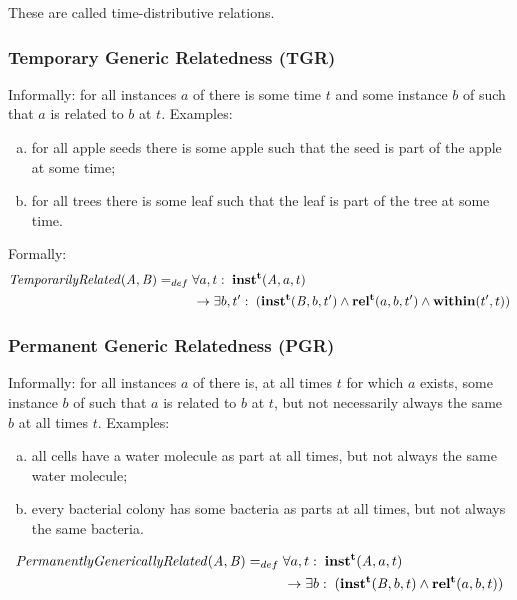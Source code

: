 These are called time-distributive relations.

\subsubsection*{Temporary Generic Relatedness (TGR)}

Informally: for all instances $a$ of  there is some time $t$ and some instance $b$ of
 such that $a$ is related to $b$ at $t$. Examples:
\begin{enumerate}[(a)]
\item for all apple seeds there is
some apple such that the seed is part of the apple at some time;
\item for all
trees there is some leaf such that the leaf is part of the tree at some time.
\end{enumerate}

Formally:
\begin{equation}
\begin{split}
\mathit{TemporarilyRelated}(\mathit{A},\mathit{B}) =_{def}&\;
\forall a, t:\; \mathrm{\mathbf{inst^t}}(\mathit{A}, a, t) \\
&\ \rightarrow
\exists b, t^\prime:\;(\mathrm{\mathbf{inst^t}}(\mathit{B},b,t^\prime) \wedge
\mathrm{\mathbf{rel^t}}(a,b,t^\prime) \wedge \mathrm{\mathbf{within}}(t^\prime,t))
\end{split}
\label{eq:temporarily:cls}
\end{equation}

\subsubsection*{Permanent Generic Relatedness (PGR)}

Informally: for all instances $a$ of  there is, at all times $t$ for which
$a$ exists,
some instance $b$ of  such that $a$ is related to $b$ at $t$, but not necessarily
always the same $b$ at all times $t$. Examples:
\begin{enumerate}[(a)]
\item all cells have a water molecule as
part at all times, but not always the same water molecule;
\item every bacterial colony has some bacteria as parts at all times, but not
always the same bacteria.
\end{enumerate}

\begin{equation}
\begin{split}
\mathit{PermanentlyGenericallyRelated}(\mathit{A},\mathit{B}) =_{def}&\;
\forall a, t:\; \mathrm{\mathbf{inst^t}}(\mathit{A}, a, t) \\
&\ \rightarrow
\exists b:\;(\mathrm{\mathbf{inst^t}}(\mathit{B},b,t) \wedge
\mathrm{\mathbf{rel^t}}(a,b,t))
\end{split}
\label{eq:generically:cls}
\end{equation}

